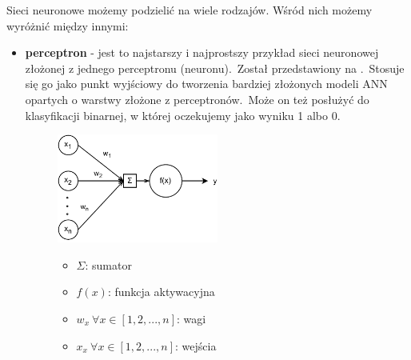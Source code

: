 Sieci neuronowe możemy podzielić na wiele rodzajów. Wśród nich możemy wyróżnić między innymi:
\begin{itemize}
    \item \textbf{perceptron} - jest to najstarszy i najprostszy przykład sieci neuronowej złożonej z jednego perceptronu (neuronu).\ Został przedstawiony na .\ Stosuje się go jako punkt wyjściowy do tworzenia bardziej złożonych modeli ANN opartych o warstwy złożone z perceptronów.\ Może on też posłużyć do klasyfikacji binarnej, w której oczekujemy jako wyniku 1 albo 0.
\begin{figure}[H]
    \centering
    \includegraphics[width=0.5\textwidth]{images/neuron}
    \begin{itemize}
        \item[] $\Sigma$: sumator
        \item[] $f(x)$: funkcja aktywacyjna
        \item[] $w_x \  \forall x \in [1, 2, ..., n]$: wagi
        \item[] $x_x \  \forall x \in [1, 2, ..., n]$: wejścia
    \end{itemize}
    \label{fig:neuron}
\end{figure}


\end{itemize}
